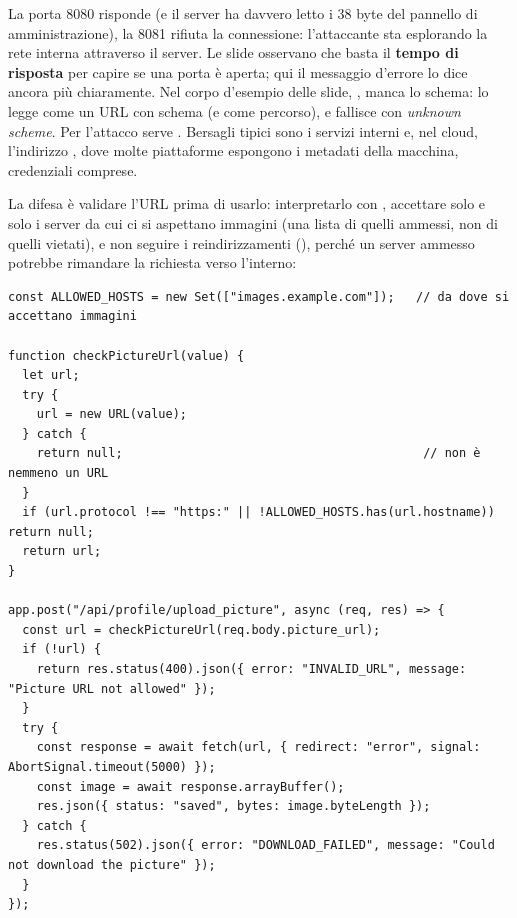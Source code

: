 La porta 8080 risponde (e il server ha davvero letto i 38 byte del pannello di
amministrazione), la 8081 rifiuta la connessione: l'attaccante sta esplorando la
rete interna attraverso il server. Le slide osservano che basta il
\textbf{tempo di risposta} per capire se una porta è aperta; qui il messaggio
d'errore lo dice ancora più chiaramente. Nel corpo d'esempio delle slide,
, manca lo schema:  lo legge come un URL con
schema  (e  come percorso), e fallisce con
\textit{unknown scheme}. Per l'attacco serve . Bersagli tipici
sono i servizi interni e, nel cloud, l'indirizzo , dove
molte piattaforme espongono i metadati della macchina, credenziali comprese.

La difesa è validare l'URL prima di usarlo: interpretarlo con ,
accettare solo  e solo i server da cui ci si aspettano immagini (una
lista di quelli ammessi, non di quelli vietati), e non seguire i
reindirizzamenti (), perché un server ammesso potrebbe
rimandare la richiesta verso l'interno:

\begin{lstlisting}[style=js, name=ssrf.js, firstnumber=6]
const ALLOWED_HOSTS = new Set(["images.example.com"]);   // da dove si accettano immagini

function checkPictureUrl(value) {
  let url;
  try {
    url = new URL(value);
  } catch {
    return null;                                          // non è nemmeno un URL
  }
  if (url.protocol !== "https:" || !ALLOWED_HOSTS.has(url.hostname)) return null;
  return url;
}

app.post("/api/profile/upload_picture", async (req, res) => {
  const url = checkPictureUrl(req.body.picture_url);
  if (!url) {
    return res.status(400).json({ error: "INVALID_URL", message: "Picture URL not allowed" });
  }
  try {
    const response = await fetch(url, { redirect: "error", signal: AbortSignal.timeout(5000) });
    const image = await response.arrayBuffer();
    res.json({ status: "saved", bytes: image.byteLength });
  } catch {
    res.status(502).json({ error: "DOWNLOAD_FAILED", message: "Could not download the picture" });
  }
});
\end{lstlisting}


